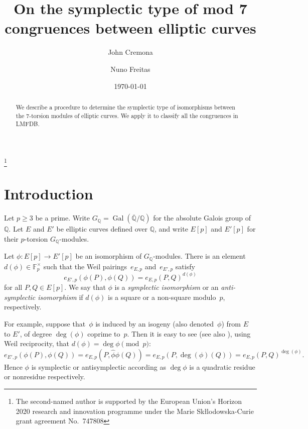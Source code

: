\documentclass[12pt]{amsart}
\newcommand{\F}{\mathbb{F}}
\newcommand{\Q}{\mathbb{Q}}
\newcommand{\Qbar}{{\overline{\Q}}}
\DeclareMathOperator{\Gal}{Gal}
\numberwithin{equation}{section}
\theoremstyle{definition}
\theoremstyle{remark}
\begin{document}
\title{On the symplectic type of mod 7 congruences between elliptic curves}

\author{John Cremona}
\address{Mathematics Institute,
         University of Warwick,
         Coventry CV4 7AL,
         United Kingdom}


\author{Nuno Freitas}
\address{Mathematics Institute,
         University of Warwick,
         Coventry CV4 7AL,
         United Kingdom}


\date{\today}


\thanks{The second-named author is supported by the European Union's
  Horizon 2020 research and innovation programme under the Marie
  Sk\l{l}odowska-Curie grant agreement No.\ 747808}


\maketitle

\begin{abstract} 
We describe a procedure to determine the symplectic type of
isomorphisms between the $7$-torsion modules of elliptic curves.  We
apply it to classify all the congruences in LMFDB.
\end{abstract}

\section{Introduction}

Let $p \geq 3$ be a prime. Write $G_\Q = \Gal(\Qbar/\Q)$ for the
absolute Galois group of $\Q$.  Let $E$ and $E'$ be elliptic curves
defined over $\Q$, and write $E[p]$ and $E'[p]$ for their $p$-torsion
$G_\Q$-modules.

Let $\phi : E[p] \to E'[p]$ be an isomorphism of $G_\Q$-modules.
There is an element $d(\phi) \in \F_p^\times$ such that the Weil
pairings~$e_{E,p}$ and~$e_{E',p}$ satisfy
\[
e_{E',p}(\phi(P), \phi(Q)) = e_{E,p}(P, Q)^{d(\phi)}
\]
for all $P, Q \in E[p]$.  We say that $\phi$ is a {\it symplectic
  isomorphism} or an {\it anti-symplectic isomorphism} if $d(\phi)$ is
a square or a non-square modulo~$p$, respectively.

For example, suppose that~$\phi$ is induced by an isogeny (also
denoted~$\phi$) from $E$ to $E'$, of degree $\deg(\phi)$ coprime
to~$p$.  Then it is easy to see (see also \cite[Corollary~1]{FKSym}),
using Weil reciprocity, that $d(\phi)=\deg\phi\pmod{p}$:
\[
  e_{E',p}(\phi(P), \phi(Q)) = e_{E,p}(P, \hat\phi\phi(Q)) =
  e_{E,p}(P, \deg(\phi)(Q)) = e_{E,p}(P, Q)^{\deg(\phi)}.
  \]
Hence $\phi$ is symplectic or antisymplectic according as $\deg\phi$
is a quadratic residue or nonresidue respectively.
\end{document}
